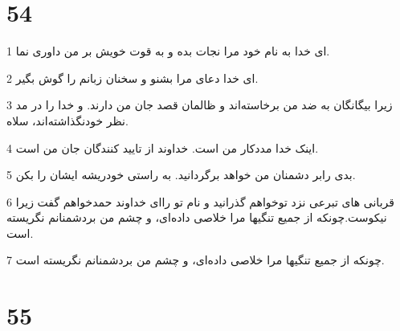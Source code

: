 \chapter{54}

\par 1 ای خدا به نام خود مرا نجات بده و به قوت خویش بر من داوری نما.
\par 2 ‌ای خدا دعای مرا بشنو و سخنان زبانم را گوش بگیر.
\par 3 زیرا بیگانگان به ضد من برخاسته‌اند و ظالمان قصد جان من دارند. و خدا را در مد نظر خودنگذاشته‌اند، سلاه.
\par 4 اینک خدا مددکار من است. خداوند از تایید کنندگان جان من است.
\par 5 بدی رابر دشمنان من خواهد برگردانید. به راستی خودریشه ایشان را بکن.
\par 6 قربانی های تبرعی نزد توخواهم گذرانید و نام تو را‌ای خداوند حمدخواهم گفت زیرا نیکوست.چونکه از جمیع تنگیها مرا خلاصی داده‌ای، و چشم من بردشمنانم نگریسته است.
\par 7 چونکه از جمیع تنگیها مرا خلاصی داده‌ای، و چشم من بردشمنانم نگریسته است.
 
\chapter{55}


